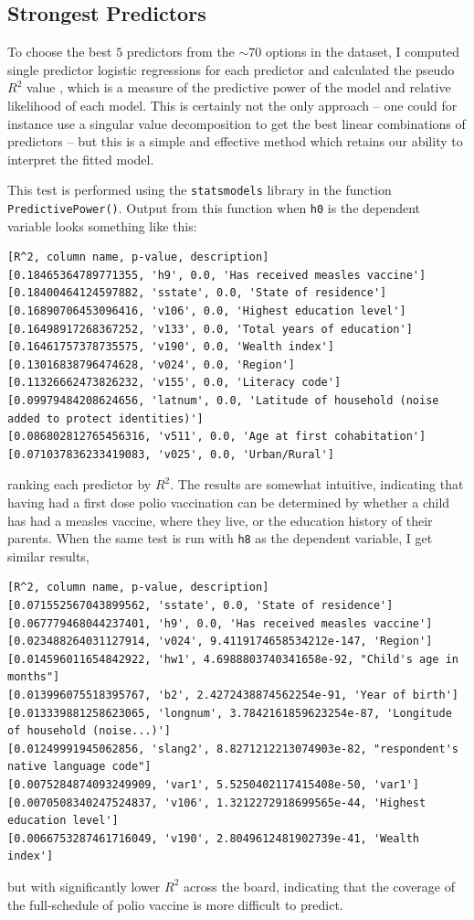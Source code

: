 \documentclass[prl,onecolumn,amsmath,amssymb,superscriptaddress,notitlepage]{revtex4-1}
\begin{document}
\subsection{Strongest Predictors}

To choose the best $5$ predictors from the $\sim 70$ options in the dataset, I computed single predictor logistic regressions for each predictor and calculated the pseudo $R^2$ value \cite{mcfadden1973}, which is a measure of the predictive power of the model and relative likelihood of each model. This is certainly not the only approach -- one could for instance use a singular value decomposition to get the best linear combinations of predictors \cite{kuhn2013} -- but this is a simple and effective method which retains our ability to interpret the fitted model.

This test is performed using the \verb|statsmodels| library in the function \verb|PredictivePower()|. Output from this function when \verb|h0| is the dependent variable looks something like this:
\begin{verbatim}
[R^2, column name, p-value, description]
[0.18465364789771355, 'h9', 0.0, 'Has received measles vaccine']
[0.18400464124597882, 'sstate', 0.0, 'State of residence']
[0.16890706453096416, 'v106', 0.0, 'Highest education level']
[0.16498917268367252, 'v133', 0.0, 'Total years of education']
[0.16461757378735575, 'v190', 0.0, 'Wealth index']
[0.13016838796474628, 'v024', 0.0, 'Region']
[0.11326662473826232, 'v155', 0.0, 'Literacy code']
[0.09979484208624656, 'latnum', 0.0, 'Latitude of household (noise added to protect identities)']
[0.086802812765456316, 'v511', 0.0, 'Age at first cohabitation']
[0.071037836233419083, 'v025', 0.0, 'Urban/Rural']
\end{verbatim}
ranking each predictor by $R^2$. The results are somewhat intuitive, indicating that having had a first dose polio vaccination can be determined by whether a child has had a measles vaccine, where they live, or the education history of their parents. When the same test is run with \verb|h8| as the dependent variable, I get similar results,
\begin{verbatim}
[R^2, column name, p-value, description]
[0.071552567043899562, 'sstate', 0.0, 'State of residence']
[0.067779468044237401, 'h9', 0.0, 'Has received measles vaccine']
[0.023488264031127914, 'v024', 9.4119174658534212e-147, 'Region']
[0.014596011654842922, 'hw1', 4.6988803740341658e-92, "Child's age in months"]
[0.013996075518395767, 'b2', 2.4272438874562254e-91, 'Year of birth']
[0.013339881258623065, 'longnum', 3.7842161859623254e-87, 'Longitude of household (noise...)']
[0.01249991945062856, 'slang2', 8.8271212213074903e-82, "respondent's native language code"]
[0.0075284874093249909, 'var1', 5.5250402117415408e-50, 'var1']
[0.0070508340247524837, 'v106', 1.3212272918699565e-44, 'Highest education level']
[0.0066753287461716049, 'v190', 2.8049612481902739e-41, 'Wealth index']
\end{verbatim}
but with significantly lower $R^2$ across the board, indicating that the coverage of the full-schedule of polio vaccine is more difficult to predict. 
\end{document}
